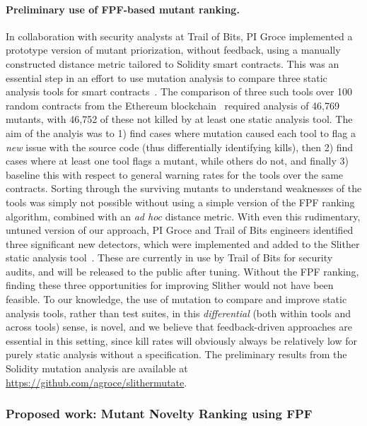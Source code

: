 \paragraph{Preliminary use of FPF-based mutant ranking.} In collaboration with security analysts at Trail of Bits, PI Groce
implemented a prototype version of mutant priorization, without
feedback, using a manually constructed distance metric tailored to
Solidity smart contracts.  This was an essential step in an effort to
use mutation analysis to compare three static analysis tools for smart
contracts~\cite{slitherpaper,sc:smartcheck,securify}.  The comparison of three such tools over 100 random contracts
from the Ethereum blockchain~\cite{buterin2013whitepaper,wood2014yellow} required analysis of 46,769 mutants, with
46,752 of these not killed by at least one static analysis tool.  The
aim of the analyis was to 1) find cases where mutation caused each
tool to flag a \emph{new} issue with the source code (thus
differentially identifying kills), then 2) find cases where at
least one tool flags a mutant, while others do not, and finally 3) baseline
this with respect to general warning rates for the tools over the same contracts.
Sorting through the surviving mutants to understand weaknesses of the
tools was simply not possible without using a simple version of the
FPF ranking algorithm, combined with an \emph{ad hoc} distance
metric.  With even this rudimentary, untuned version of our approach,
PI Groce and Trail of Bits engineers identified three significant new
detectors, which were implemented and added to the Slither static
analysis tool~\cite{slitherpaper}.  These are currently in use by Trail of Bits for
security audits, and will be released to the public after tuning.  Without the FPF ranking, finding these three
opportunities for improving Slither would not have been feasible.  To
our knowledge, the use of mutation to compare and improve static
analysis tools, rather than test suites, in this \emph{differential}
(both within tools and across tools) sense, is novel, and we believe that
feedback-driven approaches are essential in this setting, since kill
rates will obviously always be relatively low for purely static
analysis without a specification.  The preliminary results from the
Solidity mutation analysis are available at
\url{https://github.com/agroce/slithermutate}.

\subsubsection{Proposed work: Mutant Novelty Ranking using FPF}


